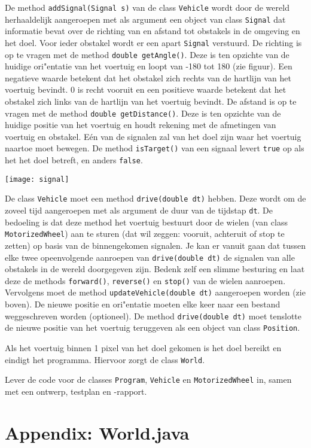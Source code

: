 \documentclass[a4paper,10pt]{article}
\newcommand{\code}[1]{\texttt{#1}}
\begin{document}
De method \code{addSignal(Signal s)} van de class \code{Vehicle} wordt door de wereld herhaaldelijk aangeroepen met als argument een object van class \code{Signal} dat informatie bevat over de richting van en afstand tot obstakels in de omgeving en het doel. Voor ieder obstakel wordt er een apart \code{Signal} verstuurd. De richting is op te vragen met de method \code{double getAngle()}. Deze is ten opzichte van de huidige ori"entatie van het voertuig en loopt van -180\textdegree{} tot 180\textdegree{} (zie figuur). Een negatieve waarde betekent dat het obstakel zich rechts van de hartlijn van het voertuig bevindt. 0\textdegree{} is recht vooruit en een positieve waarde betekent dat het obstakel zich links van de hartlijn van het voertuig bevindt. De afstand is op te vragen met de method \code{double getDistance()}. Deze is ten opzichte van de huidige positie van het voertuig en houdt rekening met de afmetingen van voertuig en obstakel. E\'en van de signalen zal van het doel zijn waar het voertuig naartoe moet bewegen. De method \code{isTarget()} van een signaal levert \code{true} op als het het doel betreft, en anders \code{false}.\\
\centerline{\texttt{[image: signal]}}

De class \code{Vehicle} moet een method \code{drive(double dt)} hebben. Deze wordt om de zoveel tijd aangeroepen met als argument de duur van de tijdstap \code{dt}. De bedoeling is dat deze method het voertuig bestuurt door de wielen (van class \code{MotorizedWheel}) aan te sturen (dat wil zeggen: vooruit, achteruit of stop te zetten) op basis van de binnengekomen signalen. Je kan er vanuit gaan dat tussen elke twee opeenvolgende aanroepen van \code{drive(double dt)} de signalen van alle obstakels in de wereld doorgegeven zijn. Bedenk zelf een slimme besturing en laat deze de methods \code{forward()}, \code{reverse()} en \code{stop()} van de wielen aanroepen. Vervolgens moet de method \code{updateVehicle(double dt)} aangeroepen worden (zie boven). De nieuwe positie en ori"entatie moeten elke keer naar een bestand weggeschreven worden (optioneel). De method \code{drive(double dt)} moet tenslotte de nieuwe positie van het voertuig teruggeven als een object van class \code{Position}.

Als het voertuig binnen 1 pixel van het doel gekomen is het doel bereikt en eindigt het programma. Hiervoor zorgt de class \code{World}.

Lever de code voor de classes \code{Program}, \code{Vehicle} en \code{MotorizedWheel} in, samen met een ontwerp, testplan en -rapport.
\newpage
\section*{Appendix: World.java}

\end{document}
